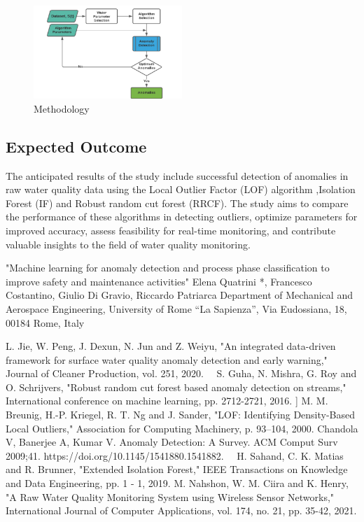 \documentclass[12pt]{report}
\begin{document}
\par
\begin{figure}[h]
    \includegraphics[width=0.5\textwidth]{methodology.png}
    \caption{Methodology}
    \label{fig:methods}
\end{figure}
\subsection{Expected  Outcome}
The anticipated results of the study include successful detection of anomalies in raw water quality data using the Local Outlier Factor (LOF) algorithm ,Isolation Forest (IF) and  Robust
random cut forest  (RRCF). The study aims to compare the performance of these algorithms in detecting outliers, optimize parameters for improved accuracy, assess feasibility for real-time monitoring, and contribute valuable insights to the field of water quality monitoring.
\newpage
%
\begin{thebibliography}{1}
"Machine learning for anomaly detection and process phase classification to improve safety and maintenance activities" Elena Quatrini *, Francesco Costantino, Giulio Di Gravio, Riccardo Patriarca Department of Mechanical and Aerospace Engineering, University of Rome “La Sapienza”, Via Eudossiana, 18, 00184 Rome, Italy

L. Jie, W. Peng, J. Dexun, N. Jun and Z. Weiyu, "An integrated data-driven framework for surface water quality anomaly detection and early warning," Journal of Cleaner Production, vol. 251, 2020. 
 S. Guha, N. Mishra, G. Roy and O. Schrijvers, "Robust random cut forest based anomaly detection on streams," International conference on machine learning, pp. 2712-2721, 2016.
] M. M. Breunig, H.-P. Kriegel, R. T. Ng and J. Sander, "LOF: Identifying Density-Based Local Outliers," Association for Computing Machinery, p. 93–104, 2000.
Chandola V, Banerjee A, Kumar V. Anomaly Detection: A Survey. ACM Comput Surv 2009;41. https://doi.org/10.1145/1541880.1541882.\
 H. Sahand, C. K. Matias and R. Brunner, "Extended Isolation Forest," IEEE Transactions on Knowledge and Data Engineering, pp. 1 - 1, 2019.
\bibitem{paper7}
M. Nahshon, W. M. Ciira and K. Henry, "A Raw Water Quality Monitoring System using Wireless Sensor Networks," International Journal of Computer Applications, vol. 174, no. 21, pp. 35-42, 2021.
\end{thebibliography}


\clearpage
\end{document}
